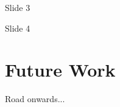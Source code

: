 \documentclass[t, 10pt, hideothersubsections, notes]{beamer}
\begin{document}
\begin{frame}{Slide 3}
\end{frame}


\begin{frame}{Slide 4}
\end{frame}



\section{Future Work}

\begin{frame}{Road onwards...}

\end{frame}


\end{document}
